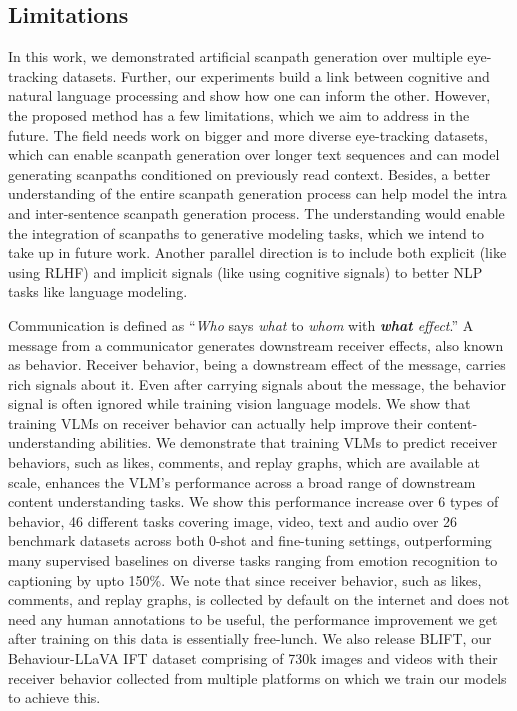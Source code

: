 \subsection{Limitations}
\label{Limitations}
In this work, we demonstrated artificial scanpath generation over multiple eye-tracking datasets. Further, our experiments build a link between cognitive and natural language processing and show how one can inform the other. However, the proposed method has a few limitations, which we aim to address in the future. The field needs work on bigger and more diverse eye-tracking datasets, which can enable scanpath generation over longer text sequences and can model generating scanpaths conditioned on previously read context. Besides, a better understanding of the entire scanpath generation process can help model the intra and inter-sentence scanpath generation process. The understanding would enable the integration of scanpaths to generative modeling tasks, which we intend to take up in future work. Another parallel direction is to include both explicit (like using RLHF) and implicit signals (like using cognitive signals) to better NLP tasks like language modeling.





\FloatBarrier
Communication is defined as ``\textit{Who} says \textit{what} to \textit{whom} with \textit{\textbf{what} effect}.'' A message from a communicator generates downstream receiver effects, also known as behavior. Receiver behavior, being a downstream effect of the message, carries rich signals about it. Even after carrying signals about the message, the behavior signal is often ignored while training vision language models. We show that training VLMs on receiver behavior can actually help improve their content-understanding abilities. We demonstrate that training VLMs to predict receiver behaviors, such as likes, comments, and replay graphs, which are available at scale, enhances the VLM's performance across a broad range of downstream content understanding tasks. We show this performance increase over 6 types of behavior, 46 different tasks covering image, video, text and audio over 26 benchmark datasets across both 0-shot and fine-tuning settings, outperforming many supervised baselines on diverse tasks ranging from emotion recognition to captioning by upto 150\%. We note that since receiver behavior, such as likes, comments, and replay graphs, is collected by default on the internet and does not need any human annotations to be useful, the performance improvement we get after training on this data is essentially free-lunch. We also release BLIFT, our Behaviour-LLaVA IFT dataset comprising of 730k images and videos with their receiver behavior collected from multiple platforms on which we train our models to achieve this.


